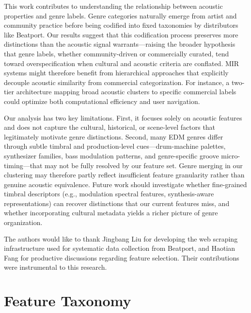 \documentclass{article}
\begin{document}
	This work contributes to understanding the relationship between acoustic properties and genre labels. Genre categories naturally emerge from artist and community practice before being codified into fixed taxonomies by distributors like Beatport. Our results suggest that this codification process preserves more distinctions than the acoustic signal warrants---raising the broader hypothesis that genre labels, whether community-driven or commercially curated, tend toward overspecification when cultural and acoustic criteria are conflated. MIR systems might therefore benefit from hierarchical approaches that explicitly decouple acoustic similarity from commercial categorization. For instance, a two-tier architecture mapping broad acoustic clusters to specific commercial labels could optimize both computational efficiency and user navigation.

	Our analysis has two key limitations. First, it focuses solely on acoustic features and does not capture the cultural, historical, or scene-level factors that legitimately motivate genre distinctions. Second, many EDM genres differ through subtle timbral and production-level cues---drum-machine palettes, synthesizer families, bass modulation patterns, and genre-specific groove micro-timing---that may not be fully resolved by our feature set. Genre merging in our clustering may therefore partly reflect insufficient feature granularity rather than genuine acoustic equivalence. Future work should investigate whether fine-grained timbral descriptors (e.g., modulation spectral features, synthesis-aware representations) can recover distinctions that our current features miss, and whether incorporating cultural metadata yields a richer picture of genre organization.

	\begin{acknowledgments}
		The authors would like to thank Jingbang Liu for developing the web scraping infrastructure used for systematic data collection from Beatport, and Haotian Fang for productive discussions regarding feature selection. Their contributions were instrumental to this research.
	\end{acknowledgments}

	

	\clearpage
	\appendix
	\section{Feature Taxonomy}\label{app:features}
\end{document}
